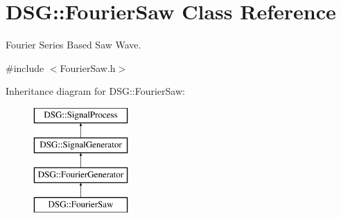 \hypertarget{classDSG_1_1FourierSaw}{\section{D\+S\+G\+:\+:Fourier\+Saw Class Reference}
\label{classDSG_1_1FourierSaw}
}


Fourier Series Based Saw Wave.  




{\ttfamily \#include $<$Fourier\+Saw.\+h$>$}

Inheritance diagram for D\+S\+G\+:\+:Fourier\+Saw\+:\begin{figure}[H]
\begin{center}
\leavevmode
\includegraphics[height=4.000000cm]{classDSG_1_1FourierSaw}
\end{center}
\end{figure}
